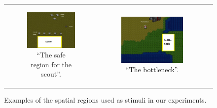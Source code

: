 \documentclass[11pt,letterpaper]{article}
\begin{document}
\begin{figure}
\begin{tabular}{c c c}
\begin{subfigure}[b]{0.32\textwidth}
  \includegraphics[width=\textwidth]{figures/tanks-close-label.jpg}
  \caption{``The safe region for the scout''.}
\end{subfigure} & 
\begin{subfigure}[b]{0.32\textwidth}
  \includegraphics[width=\textwidth]{figures/bottleneck-label.JPG}
 \caption{``The bottleneck''.}
  \label{fig:safety}
  \end{subfigure}\\
\end{tabular}
  \caption{Examples of the spatial regions used as stimuli in our experiments.}
  \label{fig:examples}
\end{figure}
\end{document}
